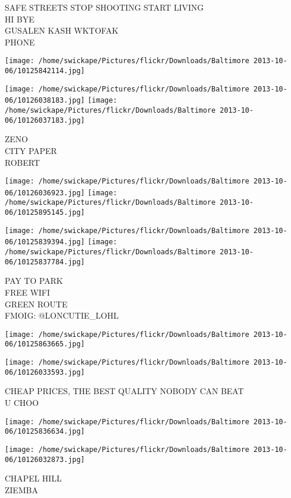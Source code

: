 \documentclass[10pt,letterpaper]{article}
\begin{document}
SAFE STREETS STOP SHOOTING START LIVING\\
HI BYE\\
GUSALEN KASH WKTOFAK\\
PHONE
\pagebreak

\texttt{[image: /home/swickape/Pictures/flickr/Downloads/Baltimore 2013-10-06/10125842114.jpg]}

\vspace{0.25in}
\texttt{[image: /home/swickape/Pictures/flickr/Downloads/Baltimore 2013-10-06/10126038183.jpg]}
\texttt{[image: /home/swickape/Pictures/flickr/Downloads/Baltimore 2013-10-06/10126037183.jpg]}

ZENO\\
CITY PAPER\\
ROBERT
\pagebreak

\texttt{[image: /home/swickape/Pictures/flickr/Downloads/Baltimore 2013-10-06/10126036923.jpg]}
\texttt{[image: /home/swickape/Pictures/flickr/Downloads/Baltimore 2013-10-06/10125895145.jpg]}

\texttt{[image: /home/swickape/Pictures/flickr/Downloads/Baltimore 2013-10-06/10125839394.jpg]}
\texttt{[image: /home/swickape/Pictures/flickr/Downloads/Baltimore 2013-10-06/10125837784.jpg]}

PAY TO PARK\\
FREE WIFI\\
GREEN ROUTE\\
FMOIG: @LONCUTIE\_LOHL
\pagebreak

\texttt{[image: /home/swickape/Pictures/flickr/Downloads/Baltimore 2013-10-06/10125863665.jpg]}

\vspace{0.25in}
\texttt{[image: /home/swickape/Pictures/flickr/Downloads/Baltimore 2013-10-06/10126033593.jpg]}

CHEAP PRICES, THE BEST QUALITY NOBODY CAN BEAT\\
U CHOO
\pagebreak

\texttt{[image: /home/swickape/Pictures/flickr/Downloads/Baltimore 2013-10-06/10125836634.jpg]}

\vspace{0.25in}
\texttt{[image: /home/swickape/Pictures/flickr/Downloads/Baltimore 2013-10-06/10126032873.jpg]}

CHAPEL HILL\\
ZIEMBA
\pagebreak
\end{document}

